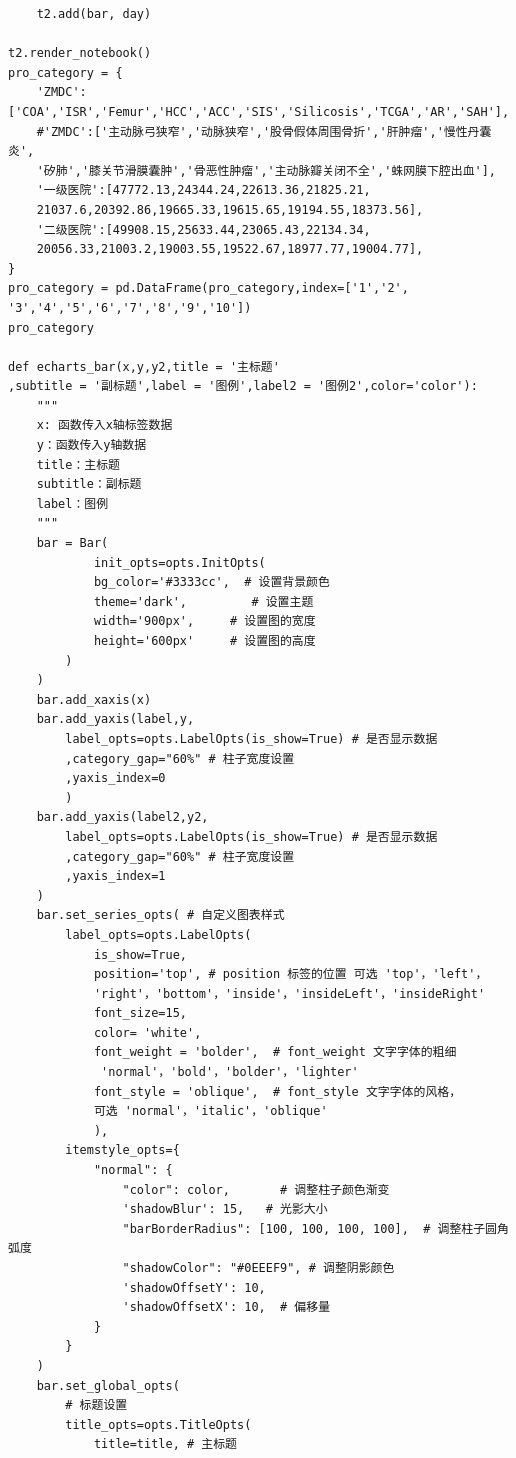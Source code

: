 \documentclass[12pt]{article}
\begin{document}
\begin{lstlisting}
    t2.add(bar, day)

t2.render_notebook()
pro_category = {
    'ZMDC':['COA','ISR','Femur','HCC','ACC','SIS','Silicosis','TCGA','AR','SAH'],
    #'ZMDC':['主动脉弓狭窄','动脉狭窄','股骨假体周围骨折','肝肿瘤','慢性丹囊炎',
    '矽肺','膝关节滑膜囊肿','骨恶性肿瘤','主动脉瓣关闭不全','蛛网膜下腔出血'],
    '一级医院':[47772.13,24344.24,22613.36,21825.21,
    21037.6,20392.86,19665.33,19615.65,19194.55,18373.56],
    '二级医院':[49908.15,25633.44,23065.43,22134.34,
    20056.33,21003.2,19003.55,19522.67,18977.77,19004.77],
}
pro_category = pd.DataFrame(pro_category,index=['1','2',
'3','4','5','6','7','8','9','10'])
pro_category

def echarts_bar(x,y,y2,title = '主标题'
,subtitle = '副标题',label = '图例',label2 = '图例2',color='color'):
    """
    x: 函数传入x轴标签数据
    y：函数传入y轴数据
    title：主标题
    subtitle：副标题
    label：图例
    """
    bar = Bar(
            init_opts=opts.InitOpts(
            bg_color='#3333cc',  # 设置背景颜色
            theme='dark',         # 设置主题
            width='900px',     # 设置图的宽度
            height='600px'     # 设置图的高度
        )
    )
    bar.add_xaxis(x)
    bar.add_yaxis(label,y,
        label_opts=opts.LabelOpts(is_show=True) # 是否显示数据
        ,category_gap="60%" # 柱子宽度设置
        ,yaxis_index=0
        )
    bar.add_yaxis(label2,y2,
        label_opts=opts.LabelOpts(is_show=True) # 是否显示数据
        ,category_gap="60%" # 柱子宽度设置
        ,yaxis_index=1
    )
    bar.set_series_opts( # 自定义图表样式
        label_opts=opts.LabelOpts(
            is_show=True,
            position='top', # position 标签的位置 可选 'top'，'left'，
            'right'，'bottom'，'inside'，'insideLeft'，'insideRight'
            font_size=15,
            color= 'white',
            font_weight = 'bolder',  # font_weight 文字字体的粗细
             'normal'，'bold'，'bolder'，'lighter'
            font_style = 'oblique',  # font_style 文字字体的风格，
            可选 'normal'，'italic'，'oblique'
            ),
        itemstyle_opts={
            "normal": {
                "color": color,       # 调整柱子颜色渐变
                'shadowBlur': 15,   # 光影大小
                "barBorderRadius": [100, 100, 100, 100],  # 调整柱子圆角弧度
                "shadowColor": "#0EEEF9", # 调整阴影颜色
                'shadowOffsetY': 10,
                'shadowOffsetX': 10,  # 偏移量
            }
        }
    )
    bar.set_global_opts(
        # 标题设置
        title_opts=opts.TitleOpts(
            title=title, # 主标题

\end{lstlisting}
\end{document}
